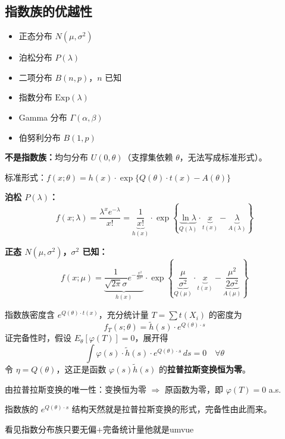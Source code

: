 \subsection{指数族的优越性}
\begin{note}[指数族的常见成员]
\begin{itemize}
    \item 正态分布 $N(\mu,\sigma^2)$
    \item 泊松分布 $P(\lambda)$
    \item 二项分布 $B(n,p)$，$n$ 已知
    \item 指数分布 $\mathrm{Exp}(\lambda)$
    \item Gamma 分布 $\Gamma(\alpha,\beta)$
    \item 伯努利分布 $B(1,p)$
\end{itemize}
\textbf{不是指数族：}均匀分布 $U(0,\theta)$（支撑集依赖 $\theta$，无法写成标准形式）。
\end{note}
\begin{note}
标准形式：$f(x;\theta) = h(x)\cdot\exp\{Q(\theta)\cdot t(x) - A(\theta)\}$

\textbf{泊松 $P(\lambda)$：}
$$f(x;\lambda) = \frac{\lambda^x e^{-\lambda}}{x!}
= \underbrace{\frac{1}{x!}}_{h(x)}
\cdot\exp\!\left\{
\underbrace{\ln\lambda}_{Q(\lambda)}\cdot
\underbrace{x}_{t(x)}-
\underbrace{\lambda}_{A(\lambda)}
\right\}$$

\textbf{正态 $N(\mu,\sigma^2)$，$\sigma^2$ 已知：}
$$f(x;\mu)
= \underbrace{\frac{1}{\sqrt{2\pi}\sigma}e^{-\frac{x^2}{2\sigma^2}}}_{h(x)}
\cdot\exp\!\left\{
\underbrace{\frac{\mu}{\sigma^2}}_{Q(\mu)}\cdot
\underbrace{x}_{t(x)}-
\underbrace{\frac{\mu^2}{2\sigma^2}}_{A(\mu)}
\right\}$$
\end{note}
\begin{note}[为什么指数族的充分统计量是完备的]
指数族密度含 $e^{Q(\theta)\cdot t(x)}$，充分统计量 $T=\sum t(X_i)$ 的密度为
$$f_T(s;\theta) = \tilde{h}(s)\cdot e^{Q(\theta)\cdot s}$$
证完备性时，假设 $E_\theta[\varphi(T)]=0$，展开得
$$\int \varphi(s)\cdot\tilde{h}(s)\cdot e^{Q(\theta)\cdot s}\,ds = 0 \quad \forall\theta$$
令 $\eta=Q(\theta)$，这正是函数 $\varphi(s)\tilde{h}(s)$ 的\textbf{拉普拉斯变换恒为零}。

由拉普拉斯变换的唯一性：变换恒为零 $\Rightarrow$ 原函数为零，即 $\varphi(T)=0$ a.s.

指数族的 $e^{Q(\theta)\cdot s}$ 结构天然就是拉普拉斯变换的形式，完备性由此而来。
\end{note}
\begin{dxtips}
    看见指数分布族只要无偏+完备统计量他就是umvue
\end{dxtips}
